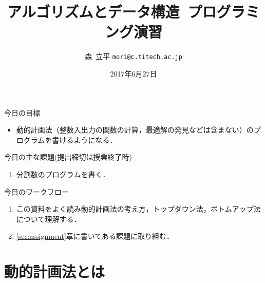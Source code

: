 \documentclass[a4paper,twoside,onecolumn,openany,article]{memoir}
\title{アルゴリズムとデータ構造~プログラミング演習}
\date{2017年6月27日}
\author{森~立平 \texttt{mori@c.titech.ac.jp}}
\theoremstyle{remark}
\begin{document}
\maketitle

\noindent
今日の目標
\begin{itemize}
\item 動的計画法（整数入出力の関数の計算，最適解の発見などは含まない）のプログラムを書けるようになる．
\end{itemize}

\noindent
今日の主な課題(提出締切は授業終了時)
\begin{enumerate}
\item 分割数のプログラムを書く．
\end{enumerate}

\noindent
今日のワークフロー
\begin{enumerate}
\item この資料をよく読み動的計画法の考え方，トップダウン法，ボトムアップ法について理解する．
\item \ref{sec:assignment}章に書いてある課題に取り組む．
\end{enumerate}

\section{動的計画法とは}
\end{document}
